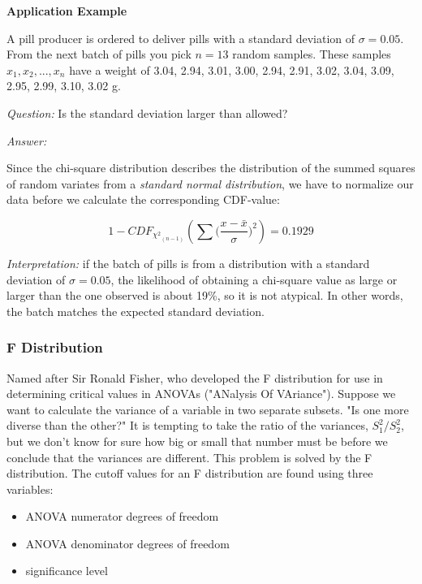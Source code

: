 \textbf{Application Example}

A pill producer is ordered to deliver pills with a standard deviation of $\sigma=0.05$. From the next batch of pills you pick $n=13$ random samples. These samples $x_1, x_2, . . . , x_n$ have a weight of
3.04, 2.94, 3.01, 3.00, 2.94, 2.91, 3.02, 3.04, 3.09, 2.95, 2.99, 3.10, 3.02 g.

\emph{Question:} Is the standard deviation larger than allowed?

\emph{Answer:}

Since the chi-square distribution describes the distribution of the summed squares of random variates from a \emph{standard normal distribution}, we have to normalize our data before we calculate the corresponding CDF-value:

\begin{equation}
  1 - CD{F_{{\chi ^2}_{(n - 1)}}}\left( {\sum {(\frac{{x - \bar x}}{\sigma }} {)^2}} \right) = 0.1929
\end{equation}

\emph{Interpretation:} if the batch of pills is from a distribution with a standard deviation of $\sigma=0.05$, the likelihood of obtaining a chi-square value as large or larger than the one observed is about 19\%, so it is not atypical. In other words, the batch matches the expected standard deviation.

\subsubsection{F Distribution}
Named after Sir Ronald Fisher, who developed the F distribution for use in determining critical values in ANOVAs ("ANalysis Of VAriance").
Suppose we want to calculate the variance of a variable in two separate subsets. "Is one more diverse than the other?" It is tempting to take the ratio of the variances, $S_1^2 / S_2^2$, but we don't know for sure how big or small that number must be before we conclude that the variances are different. This problem is solved by the F distribution. The cutoff values for an F distribution are found using three variables:

\begin{itemize}
  \item ANOVA numerator degrees of freedom
  \item ANOVA denominator degrees of freedom
  \item significance level
\end{itemize}

